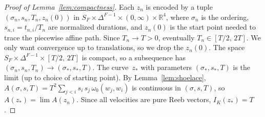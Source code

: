 \begin{proof}[Proof of Lemma~\ref{lem:compactness}]
Each $z_n$ is encoded by a tuple
$(\sigma_n, s_n, T_n, z_n(0))$
in $S_F \times \Delta^{F-1} \times (0,\infty) \times \mathbb{R}^4$,
where $\sigma_n$ is the ordering,
$s_{n,i} = t_{n,i} / T_n$ are normalized durations,
and $z_n(0)$ is the start point needed to trace the piecewise affine path.
Since $T_n \to T > 0$, eventually
$T_n \in [T/2,\, 2T]$.
We only want convergence up to translations, so we drop the $z_n(0)$.
The space
$S_F \times \Delta^{F-1} \times [T/2,\, 2T]$
is compact, so a subsequence has
$(\sigma_n, s_n, T_n) \to (\sigma_*, s_*, T)$.
The curve~$z_*$ with parameters
$(\sigma_*, s_*, T)$ is the limit (up to choice of starting point).
By Lemma~\ref{lem:shoelace},
$A(\sigma, s, T) = T^2 \sum_{j<i} s_i\, s_j\,
\omega_0(w_j, w_i)$ is continuous in $(\sigma, s, T)$,
so $A(z_*) = \lim A(z_n)$.
Since all velocities are pure Reeb vectors,
$I_K(z_*) = T$.
\end{proof}

